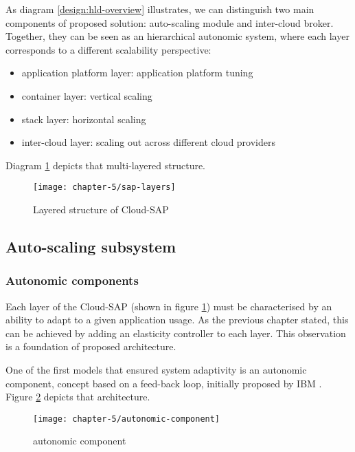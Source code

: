 As diagram \ref{design:hld-overview} illustrates, we can distinguish two main components of proposed solution: auto-scaling module and inter-cloud broker. Together, they can be seen as an hierarchical autonomic system, where each layer corresponds to a different scalability perspective:
\begin{itemize}
	\item application platform layer: application platform tuning
	\item container layer: vertical scaling
	\item stack layer: horizontal scaling
	\item inter-cloud layer: scaling out across different cloud providers
\end{itemize}

Diagram \ref{design:csap-layers} depicts that multi-layered structure.

\begin{figure}[!ht]
  \begin{center}
    \texttt{[image: chapter-5/sap-layers]}
  \end{center}
  \caption{Layered structure of Cloud-SAP}
  \label{design:csap-layers}
\end{figure}

\subsection{Auto-scaling subsystem}

\subsubsection{Autonomic components}
Each layer of the Cloud-SAP (shown in figure \ref{design:csap-layers}) must be characterised by an ability to adapt to a given application usage. As the previous chapter stated, this can be achieved by adding an elasticity controller to each layer. This observation is a foundation of proposed architecture.

One of the first models that ensured system adaptivity is an autonomic component, concept based on a feed-back loop, initially proposed by IBM \cite{IBM06}. Figure \ref{design:autonomic-component} depicts that architecture. 

\begin{figure}[!ht]
  \begin{center}
    \texttt{[image: chapter-5/autonomic-component]}
  \end{center}
  \caption{autonomic component}
  \label{design:autonomic-component}
\end{figure}

